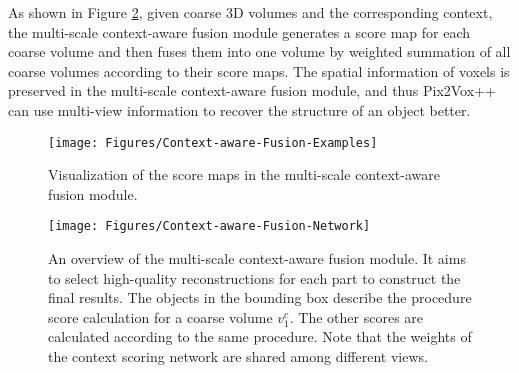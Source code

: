 \documentclass[twocolumn]{svjour3}
\begin{document}
As shown in Figure \ref{fig:context-aware-fusion-network-architecture}, given coarse 3D volumes and the corresponding context, the multi-scale context-aware fusion module generates a score map for each coarse volume and then fuses them into one volume by weighted summation of all coarse volumes according to their score maps.
The spatial information of voxels is preserved in the multi-scale context-aware fusion module, and thus Pix2Vox++ can use multi-view information to recover the structure of an object better.

\begin{figure}[!t]
  \centering
  \resizebox{\linewidth}{!} {
    \texttt{[image: Figures/Context-aware-Fusion-Examples]}
  }
  \caption{Visualization of the score maps in the multi-scale context-aware fusion module.}
  \label{fig:context-aware-fusion-examples}
\end{figure}

\begin{figure}[!t]
  \centering
  \resizebox{\linewidth}{!} {
    \texttt{[image: Figures/Context-aware-Fusion-Network]}
  }
  \caption{An overview of the multi-scale context-aware fusion module. It aims to select high-quality reconstructions for each part to construct the final results. The objects in the bounding box describe the procedure score calculation for a coarse volume $v^c_1$. The other scores are calculated according to the same procedure. Note that the weights of the context scoring network are shared among different views.}
  \label{fig:context-aware-fusion-network-architecture}
\end{figure}
\end{document}
